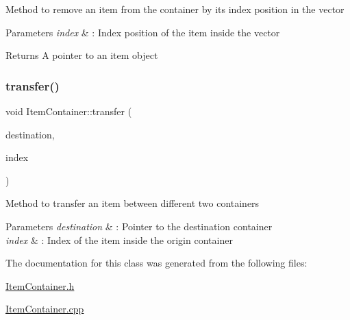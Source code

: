 Method to remove an item from the container by its index position in the vector 
\begin{DoxyParams}{Parameters}
{\em index} & \+: Index position of the item inside the vector \\
\hline
\end{DoxyParams}
\begin{DoxyReturn}{Returns}
A pointer to an item object 
\end{DoxyReturn}
\hypertarget{class_item_container_a8d5e3ca4ab846703a764e10ba9d0d42d}{}\label{class_item_container_a8d5e3ca4ab846703a764e10ba9d0d42d} 
\subsubsection{\texorpdfstring{transfer()}{transfer()}}
{\footnotesize\ttfamily void Item\+Container\+::transfer (\begin{DoxyParamCaption}\item[{\hyperlink{class_item_container}{Item\+Container} $\ast$}]{destination,  }\item[{int}]{index }\end{DoxyParamCaption})}

Method to transfer an item between different two containers 
\begin{DoxyParams}{Parameters}
{\em destination} & \+: Pointer to the destination container \\
\hline
{\em index} & \+: Index of the item inside the origin container \\
\hline
\end{DoxyParams}


The documentation for this class was generated from the following files\+:\begin{DoxyCompactItemize}
\item 
\hyperlink{_item_container_8h}{Item\+Container.\+h}\item 
\hyperlink{_item_container_8cpp}{Item\+Container.\+cpp}\end{DoxyCompactItemize}
